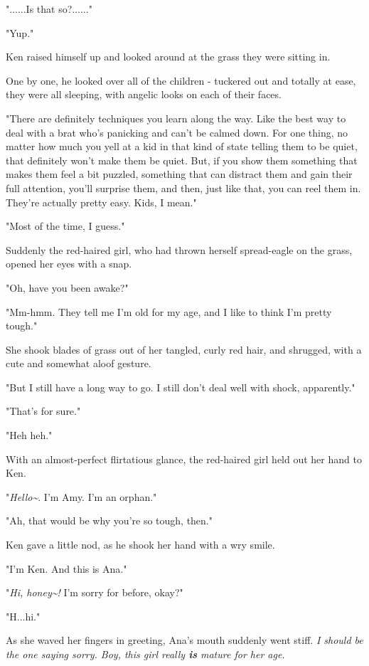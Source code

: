 \documentclass[
]{article}
\begin{document}
"......Is that so?......"

"Yup."

Ken raised himself up and looked around at the grass they were sitting
in.

One by one, he looked over all of the children - tuckered out and
totally at ease, they were all sleeping, with angelic looks on each of
their faces.

"There are definitely techniques you learn along the way. Like the best
way to deal with a brat who's panicking and can't be calmed down. For
one thing, no matter how much you yell at a kid in that kind of state
telling them to be quiet, that definitely won't make them be quiet. But,
if you show them something that makes them feel a bit puzzled, something
that can distract them and gain their full attention, you'll surprise
them, and then, just like that, you can reel them in. They're actually
pretty easy. Kids, I mean."

"Most of the time, I guess."

Suddenly the red-haired girl, who had thrown herself spread-eagle on the
grass, opened her eyes with a snap.

"Oh, have you been awake?"

"Mm-hmm. They tell me I'm old for my age, and I like to think I'm pretty
tough."

She shook blades of grass out of her tangled, curly red hair, and
shrugged, with a cute and somewhat aloof gesture.

"But I still have a long way to go. I still don't deal well with shock,
apparently."

"That's for sure."

"Heh heh."

With an almost-perfect flirtatious glance, the red-haired girl held out
her hand to Ken.

"\emph{Hello\textasciitilde{}}. I'm Amy. I'm an orphan."

"Ah, that would be why you're so tough, then."

Ken gave a little nod, as he shook her hand with a wry smile.

"I'm Ken. And this is Ana."

"\emph{Hi, honey\textasciitilde! }I'm sorry for before, okay?"

"H...hi."

As she waved her fingers in greeting, Ana's mouth suddenly went stiff.
\emph{I should be the one saying sorry. Boy, this girl really
\textbf{is} mature for her age.}
\end{document}
